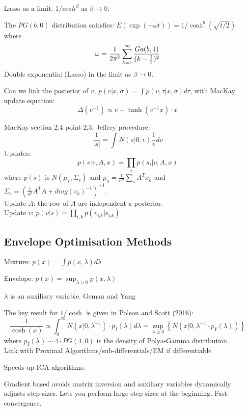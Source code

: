 \documentclass[11pt]{article}%
\begin{document}
Lasso as a limit. $ 1/cosh^\beta $ as $ \beta \rightarrow 0 $.

The $ PG(b,0) $ distribution satisfies: $ E ( \exp( - \omega t ) ) = 1 / \cosh^b ( \sqrt{ t / 2} ) $ where
$$
\omega = \frac{1}{2 \pi^2 } \sum_{k=1}^\infty \frac{ Ga(b,1 ) }{ ( k - \frac{1}{2} )^2 } 
$$
Double exponential (Lasso) in the limit as $ \beta  \rightarrow 0 $.


Can we link the posterior of $v$,  $p(v|x, \sigma) = \int p(v, \tau|x, \sigma)d\tau$, with MacKay update equation:
$$
\Delta (v^{-1}) \propto v - \tanh(v^{-1}x)\cdot x
$$

MacKay section 2.4 point 2,3.
Jeffrey procedure:
$$
\frac{1}{|s|} = \int N(s | 0, v) \frac{1}{v} dv
$$
Updates: 
$$
p(s|v, A, x) = \prod_{i} p(s_i | v, A, x)
$$
where $p(s)$ is $N(\mu_s, \Sigma_s)$ and $\mu_s = \frac{1}{\sigma^2}\sum_s A^Tx_k$ and $\Sigma_s = (\frac{1}{\sigma^2} A^TA + diag(v_k)^{-1})^{-1}$.\\
Update $A$: the row of $A$ are independent a posterior.\\
Update $v$: $p(v|s) = \prod_{i,k} p(v_{i_lk} | s_{i_lk})$



\subsection{Envelope Optimisation Methods}
Mixture: $ p( x  ) = \int p( x , \lambda ) d \lambda $

Envelope: $ p( x) = \sup_{\lambda > 0} p( x , \lambda )  $ 

$ \lambda $ is an  auxiliary variable. Geman and Yang 

The key result for $1/\cosh$ is given in Polson and Scott (2016):
\begin{equation}
	\frac{1}{\cosh(x)} \propto \int_{0}^{\infty} N(x | 0, \lambda^{-1})\cdot p_I(\lambda) d\lambda = \sup_{\lambda\geq 0} \left\{N(x | 0, \lambda^{-1} \cdot p_V(\lambda))\right\}
\end{equation}
where $p_I(\lambda) \sim 4\cdot PG(1,0)$ is the density of Polya-Gamma distribution. \\

Link with Proximal Algorithms/sub-differentials/EM if differentiable


Speeds up ICA algorithms.  


Gradient based avoids matrix inversion and auxiliary variables dynamically adjusts step-sizes.
Lets you perform large step sizes at the beginning. Fast convergence.
\end{document}
